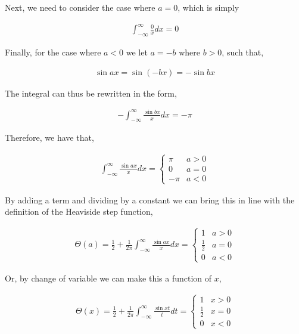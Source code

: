 \documentclass[11pt]{amsart}
\begin{document}
Next, we need to consider the case where $a = 0$, which is simply

\begin{align*}
  \int_{-\infty}^{\infty} \frac{0}{x} dx = 0
\end{align*}

Finally, for the case where $a < 0$ we let $a = -b$ where $b > 0$, such that,

\begin{align*}
  \sin ax = \sin(-bx) = -\sin bx
\end{align*}

The integral can thus be rewritten in the form,

\begin{align*}
  -\int_{-\infty}^{\infty} \frac{\sin bx}{x} dx = -\pi
\end{align*}

Therefore, we have that,

\begin{align*}
  \int_{-\infty}^{\infty} \frac{\sin ax}{x} dx =
  \begin{cases}
    \pi & a > 0 \\
    0 & a = 0 \\
    -\pi & a < 0
  \end{cases}
\end{align*}

By adding a term and dividing by a constant we can bring this in line with the definition of the Heaviside step function,

\begin{align*}
  \Theta(a) = \frac{1}{2} + \frac{1}{2\pi}\int_{-\infty}^{\infty}\frac{\sin ax}{x} dx=
  \begin{cases}
    1 & a > 0 \\
    \frac{1}{2} & a = 0 \\
    0 & a < 0
  \end{cases}
\end{align*}

Or, by change of variable we can make this a function of $x$,

\begin{align*}
  \Theta(x) = \frac{1}{2} + \frac{1}{2\pi}\int_{-\infty}^{\infty}\frac{\sin xt}{t} dt=
  \begin{cases}
    1 & x > 0 \\
    \frac{1}{2} & x = 0 \\
    0 & x < 0
  \end{cases}
\end{align*}
\end{document}
